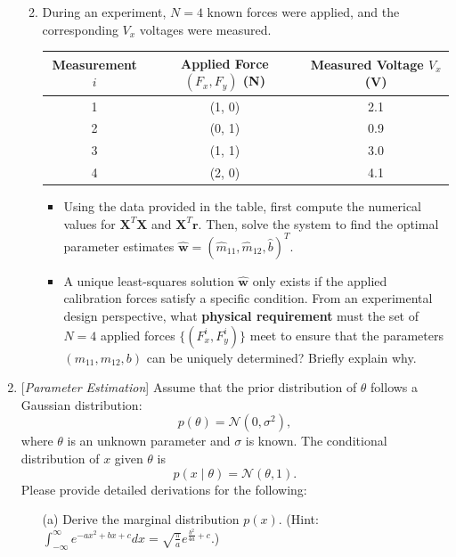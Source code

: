 \documentclass[10pt]{article}
\newcommand{\mbf}[1]{\mathbf{#1}}
\newcommand{\mat}[1]{\mathbf{#1}}
\begin{document}
\begin{enumerate}
\begin{enumerate}
\begin{itemize}
    \end{itemize}
    
    \item During an experiment, $N=4$ known forces were applied, and the corresponding $V_x$ voltages were measured.

\begin{center}
\begin{tabular}{c c c}
\toprule
Measurement $i$ & Applied Force $(F_x, F_y)$ (N) & Measured Voltage $V_x$ (V) \\
\midrule
1 & (1, 0) & 2.1 \\
2 & (0, 1) & 0.9 \\
3 & (1, 1) & 3.0 \\
4 & (2, 0) & 4.1 \\
\bottomrule
\end{tabular}
\end{center}
\begin{itemize}
    \item Using the data provided in the table, first compute the numerical values for $\mat{X}^T \mat{X}$ and $\mat{X}^T \mbf{r}$. Then, solve the system to find the optimal parameter estimates $\hat{\mbf{w}} = (\hat{m}_{11}, \hat{m}_{12}, \hat{b})^T$. 
    \item A unique least-squares solution $\hat{\mbf{w}}$ only exists if the applied calibration forces satisfy a specific condition. From an experimental design perspective, what \textbf{physical requirement} must the set of $N=4$ applied forces $\{ (F_x^i, F_y^i) \}$ meet to ensure that the parameters $(m_{11}, m_{12}, b)$ can be uniquely determined? Briefly explain why. 
\end{itemize}
\end{enumerate}

\newpage

\item {} {[}\textit{Parameter Estimation}{]} 
Assume that the prior distribution of $\theta$ follows a Gaussian distribution:
$$p(\theta) = \mathcal{N}(0, \sigma^2),$$
where $\theta$ is an unknown parameter and $\sigma$  is known. The conditional distribution of $x$ given $\theta$ is
$$p(x \mid \theta) = \mathcal{N}(\theta, 1).$$
Please provide detailed derivations for the following:
\begin{itemize}
	\item[(a)] Derive the marginal distribution $p(x)$. (Hint: $\int_{-\infty}^{\infty} e^{-a x^2 + b x + c} dx = \sqrt{\frac{\pi}{a}}e^{\frac{b^2}{4a} + c}$.) 
    

\end{itemize}
\end{enumerate}
\end{document}
